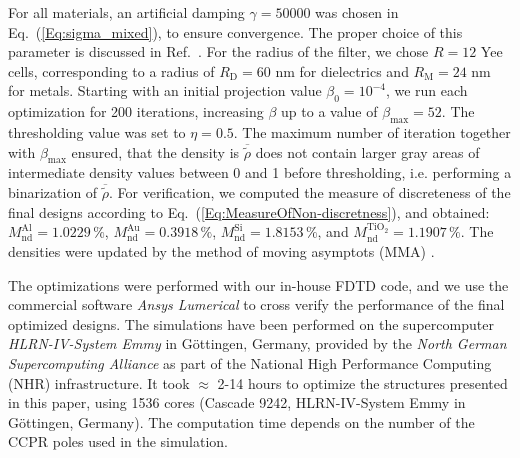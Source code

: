 \documentclass[aps,prl,twocolumn,superscriptaddress,longbibliography]{revtex4-1}
\begin{document}
For all materials, an artificial damping $\gamma=50000$ was chosen in Eq.~(\ref{Eq:sigma_mixed}), to ensure convergence. The proper choice of this parameter is discussed in Ref.~\cite{Hassan:22}. For the radius of the filter, we chose $R=12$ Yee cells, corresponding to a radius of $R_{\mathrm{D}}=60$ nm for dielectrics and $R_{\mathrm{M}}=24$ nm for metals. Starting with an initial projection value $\beta_0=10^{-4}$, we run each optimization for 200 iterations, increasing $\beta$ up to a value of $\beta_{\mathrm{max}}=52$. The thresholding value was set to $\eta=0.5$. The maximum number of iteration together with $\beta_{\mathrm{max}}$ ensured, that the density is $\overline{\tilde{\rho}}$ does not contain larger gray areas of intermediate density values between 0 and 1 before thresholding, i.e. performing a binarization of $\overline{\tilde{\rho}}$. For verification, we computed the measure of discreteness of the final designs according to Eq.~(\ref{Eq:MeasureOfNon-discretness}), and obtained: $M^{\mathrm{Al}}_{\mathrm{n d}}=1.0229\,\%$, $M^{\mathrm{Au}}_{\mathrm{n d}}=0.3918\,\%$, $M^{\mathrm{Si}}_{\mathrm{n d}}=1.8153\,\%$, and $M^{\mathrm{TiO_2}}_{\mathrm{n d}}=1.1907\,\%$.
The densities were updated by the method of moving asymptots (MMA) \cite{Svanberg1987}.\par
The optimizations were performed with our in-house FDTD code, and we use the commercial software \textit{Ansys Lumerical} to cross verify the performance of the final optimized designs. 
The simulations have been performed on the supercomputer \textit{HLRN-IV-System Emmy} in G\"ottingen, Germany, provided by the \textit{North German Supercomputing Alliance} as part of the National High Performance Computing (NHR) infrastructure. 
It took $\approx$ 2-14 hours to optimize the structures presented in this paper, using 1536 cores (Cascade 9242, HLRN-IV-System Emmy in G\"ottingen, Germany). 
The computation time depends on the number of the CCPR poles used in the simulation.
\end{document}
